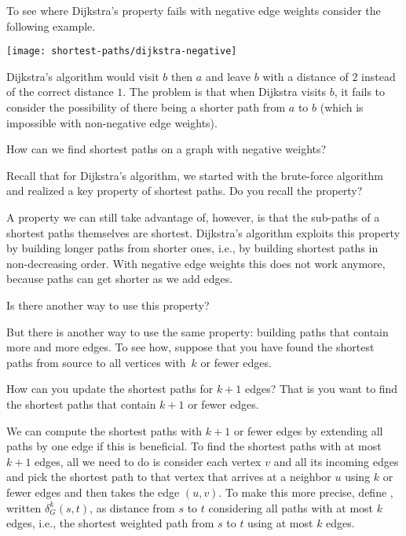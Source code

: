 \begin{example}
To see where Dijkstra's property fails with negative edge weights
consider the following example.
\begin{center}
  \texttt{[image: shortest-paths/dijkstra-negative]}
\end{center}
Dijkstra's algorithm would visit $b$ then $a$ and leave $b$ with a
distance of $2$ instead of the correct distance $1$.  The problem is
that when Dijkstra visits $b$, it fails to consider the possibility of
there being a shorter path from $a$ to $b$ (which is impossible with
non-negative edge weights).
\end{example}

\begin{question}
How can we find shortest paths on a graph with negative weights?
\end{question}
\begin{question}
Recall that for Dijkstra's algorithm, we started with the brute-force
algorithm and realized a key property of shortest paths.  Do you
recall the property?
\end{question}

A property we can still take advantage of, however, is that the
sub-paths of a shortest paths themselves are shortest. 
%
Dijkstra's algorithm exploits this property by building longer paths
from shorter ones, i.e., by building shortest paths in non-decreasing
order.  
%
With negative edge weights this does not work anymore, because
paths can get shorter as we add edges.

\begin{question}
Is there another way to use this property?
\end{question}

But there is another way to use the same property: building paths that
contain more and more edges.  To see how, suppose that you have found
the shortest paths from source to all vertices with~$k$ or fewer
edges.
%
\begin{question}
  How can you update the shortest paths for $k+1$ edges? That is you
  want to find the shortest paths that contain $k+1$ or fewer edges.
\end{question}
%
We can compute the shortest paths with $k+1$ or fewer edges by
extending all paths by one edge if this is beneficial. 
%
To find the shortest paths with at most $k+1$ edges, all we need to do
is consider each vertex $v$ and all its incoming edges and pick the
shortest path to that vertex that arrives at a neighbor $u$ using $k$
or fewer edges and then takes the edge $(u,v)$.
%
To make this more precise, define , written
$\delta^k_G(s,t)$, as distance from $s$ to $t$ considering all paths
with at most $k$ edges, i.e., the shortest weighted path from $s$ to
$t$ using at most $k$ edges.
%


